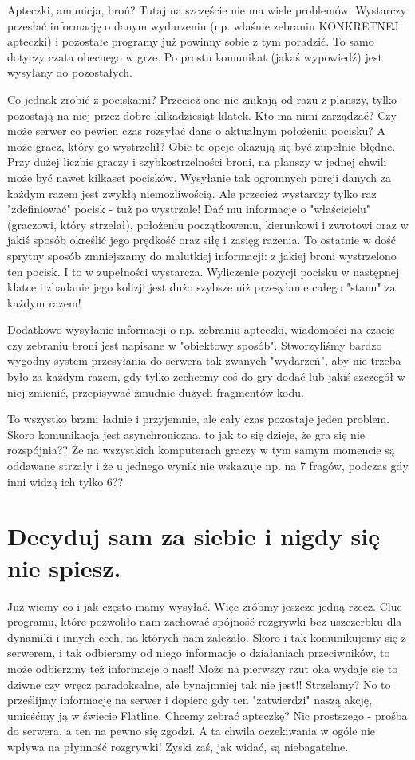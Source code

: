 \documentclass[licencjacka]{pracamgr}
\begin{document}
Apteczki, amunicja, broń? Tutaj na szczęście nie ma wiele problemów. Wystarczy przesłać informację o danym wydarzeniu (np. właśnie zebraniu KONKRETNEJ apteczki) i pozostałe programy już powinny sobie z tym poradzić. To samo dotyczy czata obecnego w grze. Po prostu komunikat (jakaś wypowiedź) jest wysyłany do pozostałych.

Co jednak zrobić z pociskami? Przecież one nie znikają od razu z planszy, tylko pozostają na niej przez dobre kilkadziesiąt klatek. Kto ma nimi zarządzać? Czy może serwer co pewien czas rozsyłać dane o aktualnym położeniu pocisku? A może gracz, który go wystrzelił? Obie te opcje okazują się być zupełnie błędne. Przy dużej liczbie graczy i szybkostrzelności broni, na planszy w jednej chwili może być nawet kilkaset pocisków. Wysyłanie tak ogromnych porcji danych za każdym razem jest zwykłą niemożliwością. Ale przecież wystarczy tylko raz "zdefiniować" pocisk - tuż po wystrzale! Dać mu informacje o "właścicielu" (graczowi, który strzelał), położeniu początkowemu, kierunkowi i zwrotowi oraz w jakiś sposób określić jego prędkość oraz siłę i zasięg rażenia. To ostatnie w dość sprytny sposób zmniejszamy do malutkiej informacji: z jakiej broni wystrzelono ten pocisk. I to w zupełności wystarcza. Wyliczenie pozycji pocisku w następnej klatce i zbadanie jego kolizji jest dużo szybsze niż przesyłanie całego "stanu" za każdym razem!

Dodatkowo wysyłanie informacji o np. zebraniu apteczki, wiadomości na czacie czy zebraniu broni jest napisane w "obiektowy sposób". Stworzyliśmy bardzo wygodny system przesyłania do serwera tak zwanych "wydarzeń", aby nie trzeba było za każdym razem, gdy tylko zechcemy coś do gry dodać lub jakiś szczegół w niej zmienić, przepisywać żmudnie dużych fragmentów kodu.

To wszystko brzmi ładnie i przyjemnie, ale cały czas pozostaje jeden problem. Skoro komunikacja jest asynchroniczna, to jak to się dzieje, że gra się nie rozspójnia?? Że na wszystkich komputerach graczy w tym samym momencie są oddawane strzały i że u jednego wynik nie wskazuje np. na 7 fragów, podczas gdy inni widzą ich tylko 6??

\section{Decyduj sam za siebie i nigdy się nie spiesz.}

Już wiemy co i jak często mamy wysyłać. Więc zróbmy jeszcze jedną rzecz. Clue programu, które pozwoliło nam zachować spójność rozgrywki bez uszczerbku dla dynamiki i innych cech, na których nam zależało. Skoro i tak komunikujemy się z serwerem, i tak odbieramy od niego informacje o działaniach przeciwników, to może odbierzmy też informacje o nas!! Może na pierwszy rzut oka wydaje się to dziwne czy wręcz paradoksalne, ale bynajmniej tak nie jest!! Strzelamy? No to prześlijmy informację na serwer i dopiero gdy ten "zatwierdzi" naszą akcję, umieśćmy ją w świecie Flatline. Chcemy zebrać apteczkę? Nic prostszego - prośba do serwera, a ten na pewno się zgodzi. A ta chwila oczekiwania w ogóle nie wpływa na płynność rozgrywki! Zyski zaś, jak widać, są niebagatelne.
\end{document}

